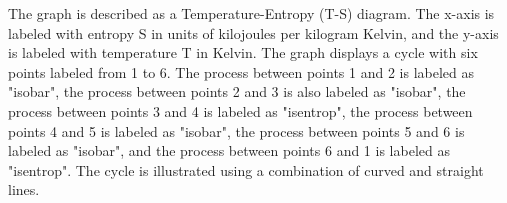 The graph is described as a Temperature-Entropy (T-S) diagram. The x-axis is labeled with entropy S in units of kilojoules per kilogram Kelvin, and the y-axis is labeled with temperature T in Kelvin. The graph displays a cycle with six points labeled from 1 to 6. The process between points 1 and 2 is labeled as "isobar", the process between points 2 and 3 is also labeled as "isobar", the process between points 3 and 4 is labeled as "isentrop", the process between points 4 and 5 is labeled as "isobar", the process between points 5 and 6 is labeled as "isobar", and the process between points 6 and 1 is labeled as "isentrop". The cycle is illustrated using a combination of curved and straight lines.